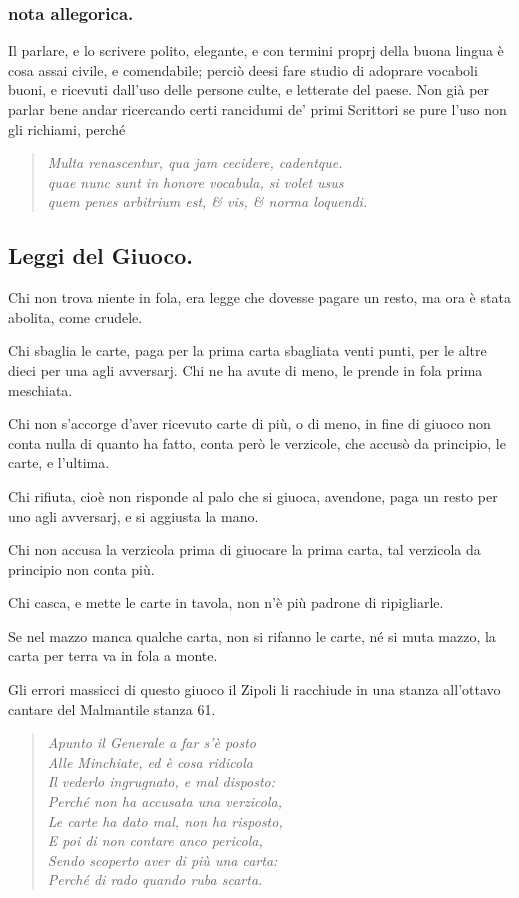 \documentclass[11pt,a6paper]{article}
\newcommand{\literaryquote}[1]{%
\kern -6pt  \begin{verse}
    {\footnotesize \it #1}
  \end{verse}\kern -2pt%
}
\begin{document}
\subsubsection{nota allegorica.}
{\footnotesize
Il parlare, e lo scrivere polito, elegante, e con
termini proprj della buona lingua è cosa assai civile,
e comendabile; perciò deesi fare studio di adoprare
vocaboli buoni, e ricevuti dall'uso delle persone
culte, e letterate del paese. Non già per parlar
bene andar ricercando certi rancidumi de' primi Scrittori
se pure l'uso non gli richiami, perché
\literaryquote{
Multa renascentur, qua jam cecidere, cadentque.\\
quae nunc sunt in honore vocabula, si volet usus\\
quem penes arbitrium est, \& vis, \& norma loquendi.}
}
\subsection{Leggi del Giuoco.}

Chi non trova niente in fola, era legge
che dovesse pagare un resto, ma ora è
stata abolita, come crudele.

Chi sbaglia le carte, paga per la prima
carta sbagliata venti punti, per le altre dieci
per una agli avversarj. Chi ne ha avute di
meno, le prende in fola prima meschiata.

Chi non s'accorge d'aver ricevuto carte
di più, o di meno, in fine di giuoco non conta
nulla di quanto ha fatto, conta però le verzicole,
che accusò da principio, le carte, e
l'ultima.

Chi rifiuta, cioè non risponde al palo
che si giuoca, avendone, paga un resto per
uno agli avversarj, e si aggiusta la mano.

Chi non accusa la verzicola prima di
giuocare la prima carta, tal verzicola da
principio non conta più.

Chi casca, e mette le carte in tavola,
non n'è più padrone di ripigliarle.

Se nel mazzo manca qualche carta, non si
rifanno le carte, né si muta mazzo, la carta
per terra va in fola a monte.

Gli errori massicci di questo giuoco il Zipoli
li racchiude in una stanza all'ottavo cantare
del Malmantile stanza 61.

\literaryquote{\normalsize Apunto il Generale a far s'è posto\\
Alle Minchiate, ed è cosa ridicola\\
Il vederlo ingrugnato, e mal disposto:\\
Perché non ha accusata una verzicola,\\
 Le carte ha dato mal, non ha risposto,\\
E poi di non contare anco pericola,\\
Sendo scoperto aver di più una carta:\\
Perché di rado quando ruba scarta.}
\end{document}
